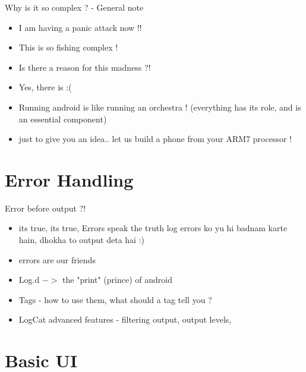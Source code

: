 \documentclass[11pt]{beamer}
\begin{document}
\begin{frame}[containsverbatim]{Why is it so complex ? - General note}
	\begin{flushleft}
	\begin{itemize}
		\item I am having a panic attack now !!
		\item This is so fishing complex ! 
		\item Is there a reason for this madness ?!
		\item Yes, there is :(
		\item Running android is like running an orchestra !
              (everything has its role, and is an essential component)
		\item just to give you an idea.. let us build a phone from your ARM7 processor !
	\end{itemize}
	\end{flushleft}
\end{frame}

\section{Error Handling}

\begin{frame}[containsverbatim]{Error before output ?!}

	\begin{flushleft}
	\begin{itemize}
		\item its true, its true, Errors speak the truth
                log errors ko yu hi badnam karte hain, dhokha to output deta hai :)
		\item errors are our friends
		\item Log.d $->$ the "print" (prince) of android 
		\item Tags - how to use them, what should a tag tell you ?
		\item LogCat advanced features - filtering output, output levels, 
	\end{itemize}
	\end{flushleft}
\end{frame}

\section{Basic UI}
\end{document}
